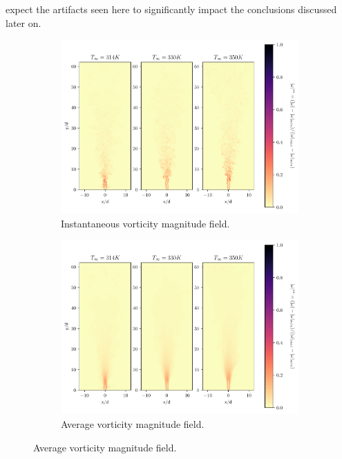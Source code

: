 expect the artifacts seen here to significantly impact the conclusions discussed later on. 

\begin{figure}[H]
\begin{subfigure}{0.5\textwidth}
	\centering
	\includegraphics[scale=.45]{figures/Plots/vertical/magvort_scaled_vert_all.pdf}
	\caption{Instantaneous vorticity magnitude field.} \label{all_magvort_1}
\end{subfigure}
\hfill
\begin{subfigure}{0.5\textwidth}
	\centering
	\includegraphics[scale=.45]{figures/Plots/vertical/magvort_scaled_vert_avg_all.pdf}
	\caption{Average vorticity magnitude field.} \label{all_magvort_2}
\end{subfigure}

\end{figure}
